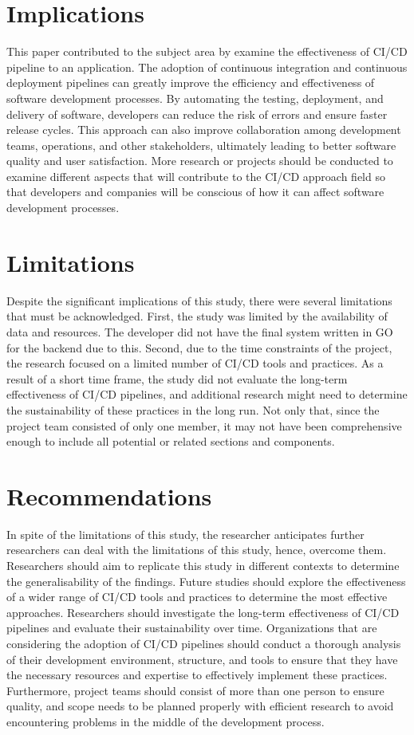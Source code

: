 \section{Implications}
This paper contributed to the subject area by examine the effectiveness of CI/CD pipeline to an application. The adoption of continuous integration and continuous deployment pipelines can greatly improve the efficiency and effectiveness of software development processes. By automating the testing, deployment, and delivery of software, developers can reduce the risk of errors and ensure faster release cycles. This approach can also improve collaboration among development teams, operations, and other stakeholders, ultimately leading to better software quality and user satisfaction. More research or projects should be conducted to examine different aspects that will contribute to the CI/CD approach field so that developers and companies will be conscious of how it can affect software development processes.

\section{Limitations}
Despite the significant implications of this study, there were several limitations that must be acknowledged. First, the study was limited by the availability of data and resources. The developer did not have the final system written in GO for the backend due to this. Second, due to the time constraints of the project, the research focused on a limited number of CI/CD tools and practices. As a result of a short time frame, the study did not evaluate the long-term effectiveness of CI/CD pipelines, and additional research might need to determine the sustainability of these practices in the long run. Not only that, since the project team consisted of only one member, it may not have been comprehensive enough to include all potential or related sections and components.

\section{Recommendations}
In spite of the limitations of this study, the researcher anticipates further researchers can deal with the limitations of this study, hence, overcome them. Researchers should aim to replicate this study in different contexts to determine the generalisability of the findings. Future studies should explore the effectiveness of a wider range of CI/CD tools and practices to determine the most effective approaches. Researchers should investigate the long-term effectiveness of CI/CD pipelines and evaluate their sustainability over time. Organizations that are considering the adoption of CI/CD pipelines should conduct a thorough analysis of their development environment, structure, and tools to ensure that they have the necessary resources and expertise to effectively implement these practices. Furthermore, project teams should consist of more than one person to ensure quality, and scope needs to be planned properly with efficient research to avoid encountering problems in the middle of the development process.